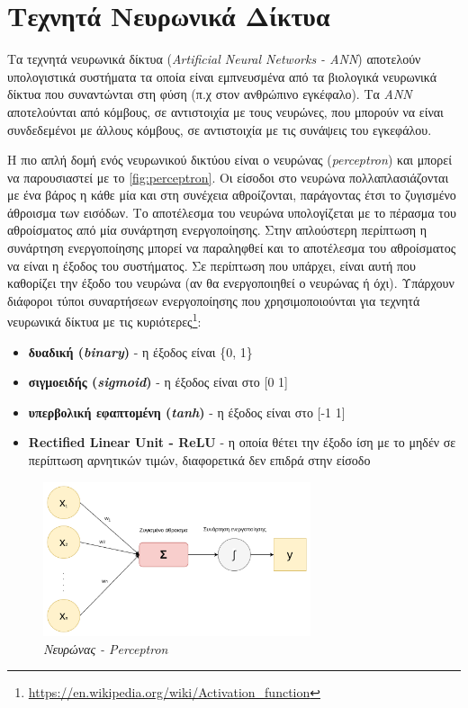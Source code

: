 \section{Τεχνητά Νευρωνικά Δίκτυα}
Τα τεχνητά νευρωνικά δίκτυα (\emph{Artificial Neural Networks - ANN}) αποτελούν υπολογιστικά συστήματα τα οποία είναι εμπνευσμένα από τα βιολογικά νευρωνικά δίκτυα που συναντώνται στη φύση (π.χ στον ανθρώπινο εγκέφαλο). Τα \emph{ANN} αποτελούνται από κόμβους, σε αντιστοιχία με τους νευρώνες, που μπορούν να είναι συνδεδεμένοι με άλλους κόμβους, σε αντιστοιχία με τις συνάψεις του εγκεφάλου.

Η πιο απλή δομή ενός νευρωνικού δικτύου είναι ο νευρώνας (\emph{perceptron}) και μπορεί να παρουσιαστεί με το \autoref{fig:perceptron}. Οι είσοδοι στο νευρώνα πολλαπλασιάζονται με ένα βάρος η κάθε μία και στη συνέχεια αθροίζονται, παράγοντας έτσι το ζυγισμένο άθροισμα των εισόδων. Το αποτέλεσμα του νευρώνα υπολογίζεται με το πέρασμα του αθροίσματος από μία συνάρτηση ενεργοποίησης. Στην απλούστερη περίπτωση η συνάρτηση ενεργοποίησης μπορεί να παραληφθεί και το αποτέλεσμα του αθροίσματος να είναι η έξοδος του συστήματος. Σε περίπτωση που υπάρχει, είναι αυτή που καθορίζει την έξοδο του νευρώνα (αν θα ενεργοποιηθεί ο νευρώνας ή όχι). Υπάρχουν διάφοροι τύποι συναρτήσεων ενεργοποίησης που χρησιμοποιούνται για τεχνητά νευρωνικά δίκτυα με τις κυριότερες\footnote{\url{https://en.wikipedia.org/wiki/Activation_function}}:

\begin{itemize}
    \item \textbf{δυαδική (\emph{binary})} - η έξοδος είναι \{0, 1\}
    \item \textbf{σιγμοειδής (\emph{sigmoid})} - η έξοδος είναι στο [0 1]
    \item \textbf{υπερβολική εφαπτομένη (\emph{tanh})} - η έξοδος είναι στο [-1 1]
    \item \textbf{Rectified Linear Unit - ReLU} -  η οποία θέτει την έξοδο ίση με το μηδέν σε περίπτωση αρνητικών τιμών, διαφορετικά δεν επιδρά στην είσοδο
\end{itemize}

\begin{figure}[!ht]
  \centering
  \captionsetup{justification=centering}
  \includegraphics[width=0.7\textwidth]{images/chapter2/perceptron.png}
  \caption{\emph{Νευρώνας - Perceptron}}
  \label{fig:perceptron}
\end{figure}
\noindent


